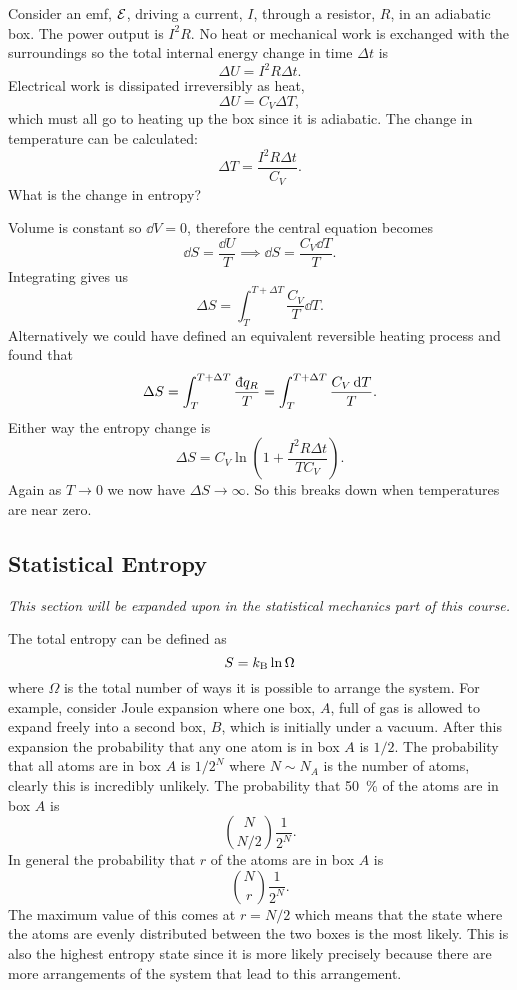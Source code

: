     \begin{example}
        Consider an emf, \(\mathcal{E}\), driving a current, \(I\), through a resistor, \(R\), in an adiabatic box.
        The power output is \(I^2R\).
        No heat or mechanical work is exchanged with the surroundings so the total internal energy change in time \(\Delta t\) is
        \[\Delta U = I^2R\Delta t.\]
        Electrical work is dissipated irreversibly as heat,
        \[\Delta U = C_V\Delta T,\]
        which must all go to heating up the box since it is adiabatic.
        The change in temperature can be calculated:
        \[\Delta T = \frac{I^2R\Delta t}{C_V}.\]
        What is the change in entropy?
        
        Volume is constant so \(\dd{V} = 0\), therefore the central equation becomes
        \[\dd{S} = \frac{\dd{U}}{T} \implies \dd{S} = \frac{C_V\dd{T}}{T}.\]
        Integrating gives us
        \[\Delta S = \int_{T}^{T + \Delta T} \frac{C_V}{T}\dd{T}.\]
        Alternatively we could have defined an equivalent reversible heating process and found that
        \[\Delta S = \int_{T}^{T + \Delta T}\frac{\ddbar{q_R}}{T} = \int_{T}^{T + \Delta T}\frac{C_V\dd{T}}{T}.\]
        Either way the entropy change is
        \[\Delta S = C_V\ln\left(1 + \frac{I^2R\Delta t}{TC_V}\right).\]
        Again as \(T \to 0\) we now have \(\Delta S \to\infty\).
        So this breaks down when temperatures are near zero.
    \end{example}
    
    \subsection{Statistical Entropy}
    \textit{This section will be expanded upon in the statistical mechanics part of this course.}
    
    The total entropy can be defined as
    \[S = k_\mathrm{B}\ln\Omega\]
    where \(\Omega\) is the total number of ways it is possible to arrange the system.
    For example, consider Joule expansion where one box, \(A\), full of gas is allowed to expand freely into a second box, \(B\), which is initially under a vacuum.
    After this expansion the probability that any one atom is in box \(A\) is \(1/2\).
    The probability that all atoms are in box \(A\) is \(1/2^N\) where \(N\sim N_A\) is the number of atoms, clearly this is incredibly unlikely.
    The probability that \SI{50}{\percent} of the atoms are in box \(A\) is
    \[{N\choose N/2} \frac{1}{2^N}.\]
    In general the probability that \(r\) of the atoms are in box \(A\) is
    \[{N\choose r}\frac{1}{2^N}.\]
    The maximum value of this comes at \(r = N/2\) which means that the state where the atoms are evenly distributed between the two boxes is the most likely.
    This is also the highest entropy state since it is more likely precisely because there are more arrangements of the system that lead to this arrangement.
    
